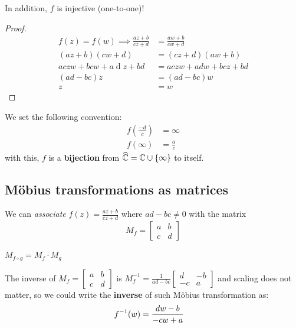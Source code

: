 \documentclass[12pt]{article}
\renewcommand{\d}{\ensuremath{\operatorname{d}}}
\begin{document}
\rmk In addition, $f$ is injective (one-to-one)!
\begin{proof}
    \begin{align*}
        f(z)=f(w)\implies \frac{az+b}{cz+d}&=\frac{aw+b}{cw+d}\\
         (az+b)(cw+d)&= (cz+d)(aw+b)\\
         aczw+bcw+a\d z+bd&=aczw+adw+bcz+bd\\
         (ad-bc)z&=(ad-bc)w\\
         z&=w
    \end{align*}
\end{proof}

 We set the following convention:\begin{align*}
    f(\frac{-d}{c})&= \infty\\
    f(\infty) &= \frac{a}{c}
\end{align*}
with this, $f$ is a \textbf{bijection} from $\widehat{\mathbb{C}}=\mathbb{C}\cup\{\infty\}$ to itself.

\subsection{Möbius transformations as matrices}
\rmk We can \textit{associate} $f(z)=\frac{az+b}{cz+d}$ where $ad-bc\neq 0$ with the matrix $$M_f=\begin{bmatrix}
    a&b\\c&d
\end{bmatrix}$$

\rmk $M_{f\circ g}=M_f\cdot M_g$

\rmk The inverse of $M_f=\begin{bmatrix}
    a&b\\c&d
\end{bmatrix}$ is $M_f^{-1}=\frac{1}{ad-bc}\begin{bmatrix}
    d&-b\\-c&a
\end{bmatrix}$ and scaling does not matter, so we could write the \textbf{inverse} of such Möbius transformation as: \begin{align*}
    f^{-1}(w) &=\frac{dw-b}{-cw+a}
\end{align*}
\end{document}
